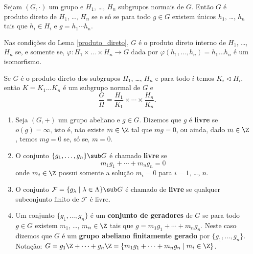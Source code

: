 \begin{lema}\label{produto_direto}
	Sejam $(G, \cdot)$ um grupo e $H_1$, \dots, $H_n$ subgrupos normais de $G$. Ent\~ao $G$ \'e produto	direto de $H_1$, \dots, $H_n$ se e s\'o se para todo $g \in G$ existem \'unicos $h_1$, \dots, $h_n$ tais que $h_i \in H_i$ e $g = h_1\cdots h_n$.
\end{lema}
\begin{prova}
	
\end{prova}

\begin{proposicao}
	Nas condi\c{c}\~oes do Lema \ref{produto_direto}, $G$ \'e o produto direto interno de $H_1$, \dots, $H_n$ se, e somente se, $\varphi : H_1 \times \dots \times H_n \to G$ dada por $\varphi(h_1, \dots, h_n) = h_1\dots h_n$ \'e um isomorfismo.
\end{proposicao}
\begin{prova}
	
\end{prova}

\begin{corolario}
	Se $G$ \'e o produto direto dos subgrupos $H_1$, \dots, $H_n$ e para todo $i$ temos $K_i \lhd H_i$, ent\~ao $K = K_1\dots K_n$ \'e um subgrupo normal de $G$ e
	\[
		\dfrac{G}{H} = \dfrac{H_1}{K_1} \times \cdots \times \dfrac{H_n}{K_n}.
	\]
\end{corolario}
\begin{prova}
	
\end{prova}


\begin{definicao}
	\begin{enumerate}
		\item Seja $(G, +)$ um grupo abeliano e $g \in G$. Dizemos que $g$ \'e \textbf{livre} se $o(g) = \infty$, isto \'e, n\~ao existe $m \in \Z$ tal que $mg = 0$, ou ainda, dado $m \in \Z$, temos $mg = 0$ se, s\'o se, $m = 0$.
		\item O conjunto $\{g_1,\dots,g_n\}\sub G$ \'e chamado \textbf{livre} se
		\[
			m_1g_1 + \cdots + m_ng_n = 0
		\]
		onde $m_i \in \Z$ possui somente a solu\c{c}\~ao $m_i = 0$ para $i = 1$, \dots, $n$.
		\item O conjunto $\mathcal{F} = \{g_\lambda \mid \lambda \in \Lambda\} \sub G$ \'e chamado de \textbf{livre} se qualquer subconjunto finito de $\mathcal{F}$ \'e livre.
		\item Um conjunto $\{g_1, \dots, g_n\}$ \'e um \textbf{conjunto de geradores} de $G$ se para todo $g \in G$ existem $m_1$, \dots, $m_n \in \Z$ tais que $g = m_1g_1 + \cdots + m_ng_n$. Neste caso dizemos que $G$ \'e um \textbf{grupo abeliano finitamente gerado} por $\{g_1,\dots,g_n\}$. Nota\c{c}\~ao: $G = g_1\Z + \cdots + g_n\Z = \{m_1g_1 + \cdots + m_ng_n \mid m_i \in \Z\}$.
	\end{enumerate}
\end{definicao}

